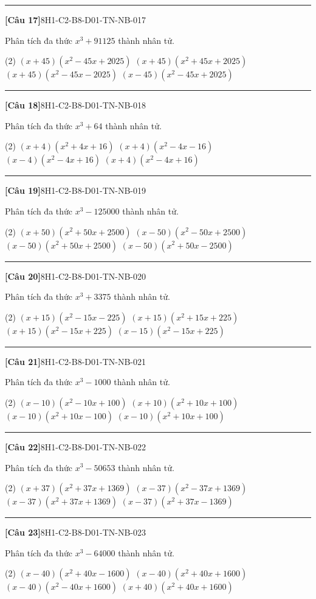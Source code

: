 \documentclass[12pt,a4paper]{article}
\newif\ifloigiai
\newenvironment{cauhoi}[2]{%
  \par\medskip\noindent\rule{\textwidth}{0.4pt}\par\nopagebreak
  \noindent\textbf{[#1]}\hfill{\scriptsize\ttfamily #2}\par\nopagebreak\smallskip}{\par}
\newcommand{\dapan}[1]{\ifloigiai\par\smallskip\noindent\textit{Đáp án:} \textbf{#1}\par\fi}
\begin{document}
\begin{cauhoi}{Câu 17}{8H1-C2-B8-D01-TN-NB-017}
Phân tích đa thức $x^{3}+91125$ thành nhân tử.
\begin{tasks}(2)
\task $(x+45)(x^{2}-45x+2025)$
\task $(x+45)(x^{2}+45x+2025)$
\task $(x+45)(x^{2}-45x-2025)$
\task $(x-45)(x^{2}-45x+2025)$
\end{tasks}
\dapan{A}
\end{cauhoi}
\begin{cauhoi}{Câu 18}{8H1-C2-B8-D01-TN-NB-018}
Phân tích đa thức $x^{3}+64$ thành nhân tử.
\begin{tasks}(2)
\task $(x+4)(x^{2}+4x+16)$
\task $(x+4)(x^{2}-4x-16)$
\task $(x-4)(x^{2}-4x+16)$
\task $(x+4)(x^{2}-4x+16)$
\end{tasks}
\dapan{D}
\end{cauhoi}
\begin{cauhoi}{Câu 19}{8H1-C2-B8-D01-TN-NB-019}
Phân tích đa thức $x^{3}-125000$ thành nhân tử.
\begin{tasks}(2)
\task $(x+50)(x^{2}+50x+2500)$
\task $(x-50)(x^{2}-50x+2500)$
\task $(x-50)(x^{2}+50x+2500)$
\task $(x-50)(x^{2}+50x-2500)$
\end{tasks}
\dapan{C}
\end{cauhoi}
\begin{cauhoi}{Câu 20}{8H1-C2-B8-D01-TN-NB-020}
Phân tích đa thức $x^{3}+3375$ thành nhân tử.
\begin{tasks}(2)
\task $(x+15)(x^{2}-15x-225)$
\task $(x+15)(x^{2}+15x+225)$
\task $(x+15)(x^{2}-15x+225)$
\task $(x-15)(x^{2}-15x+225)$
\end{tasks}
\dapan{C}
\end{cauhoi}
\begin{cauhoi}{Câu 21}{8H1-C2-B8-D01-TN-NB-021}
Phân tích đa thức $x^{3}-1000$ thành nhân tử.
\begin{tasks}(2)
\task $(x-10)(x^{2}-10x+100)$
\task $(x+10)(x^{2}+10x+100)$
\task $(x-10)(x^{2}+10x-100)$
\task $(x-10)(x^{2}+10x+100)$
\end{tasks}
\dapan{D}
\end{cauhoi}
\begin{cauhoi}{Câu 22}{8H1-C2-B8-D01-TN-NB-022}
Phân tích đa thức $x^{3}-50653$ thành nhân tử.
\begin{tasks}(2)
\task $(x+37)(x^{2}+37x+1369)$
\task $(x-37)(x^{2}-37x+1369)$
\task $(x-37)(x^{2}+37x+1369)$
\task $(x-37)(x^{2}+37x-1369)$
\end{tasks}
\dapan{C}
\end{cauhoi}
\begin{cauhoi}{Câu 23}{8H1-C2-B8-D01-TN-NB-023}
Phân tích đa thức $x^{3}-64000$ thành nhân tử.
\begin{tasks}(2)
\task $(x-40)(x^{2}+40x-1600)$
\task $(x-40)(x^{2}+40x+1600)$
\task $(x-40)(x^{2}-40x+1600)$
\task $(x+40)(x^{2}+40x+1600)$
\end{tasks}
\dapan{B}
\end{cauhoi}
\end{document}
